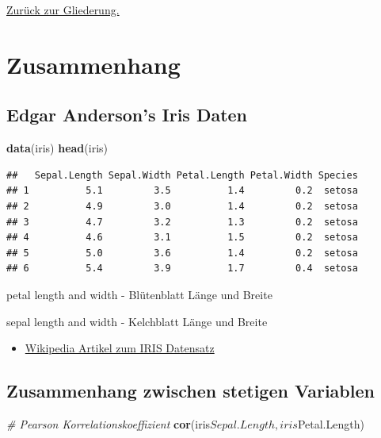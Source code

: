 \documentclass[]{article}
\newenvironment{Shaded}{\begin{snugshade}}{\end{snugshade}}
\newcommand{\KeywordTok}[1]{\textcolor[rgb]{0.13,0.29,0.53}{\textbf{{#1}}}}
\newcommand{\CommentTok}[1]{\textcolor[rgb]{0.56,0.35,0.01}{\textit{{#1}}}}
\newcommand{\NormalTok}[1]{{#1}}
\providecommand{\tightlist}{%
  \setlength{\itemsep}{0pt}\setlength{\parskip}{0pt}}
\begin{document}
\href{https://github.com/Japhilko/IntroR/blob/master/2016/README.md}{Zurück
zur Gliederung.}

\section{Zusammenhang}\label{zusammenhang}

\subsection{Edgar Anderson's Iris
Daten}\label{edgar-andersons-iris-daten}

\begin{Shaded}
\begin{Highlighting}[]
\KeywordTok{data}\NormalTok{(iris)}
\KeywordTok{head}\NormalTok{(iris)}
\end{Highlighting}
\end{Shaded}

\begin{verbatim}
##   Sepal.Length Sepal.Width Petal.Length Petal.Width Species
## 1          5.1         3.5          1.4         0.2  setosa
## 2          4.9         3.0          1.4         0.2  setosa
## 3          4.7         3.2          1.3         0.2  setosa
## 4          4.6         3.1          1.5         0.2  setosa
## 5          5.0         3.6          1.4         0.2  setosa
## 6          5.4         3.9          1.7         0.4  setosa
\end{verbatim}

petal length and width - Blütenblatt Länge und Breite

sepal length and width - Kelchblatt Länge und Breite

\begin{itemize}
\tightlist
\item
  \href{https://en.wikipedia.org/wiki/Iris_flower_data_set}{Wikipedia
  Artikel zum IRIS Datensatz}
\end{itemize}

\subsection{Zusammenhang zwischen stetigen
Variablen}\label{zusammenhang-zwischen-stetigen-variablen}

\begin{Shaded}
\begin{Highlighting}[]
\CommentTok{# Pearson Korrelationskoeffizient}
\KeywordTok{cor}\NormalTok{(iris$Sepal.Length,iris$Petal.Length)}
\end{Highlighting}
\end{Shaded}
\end{document}
